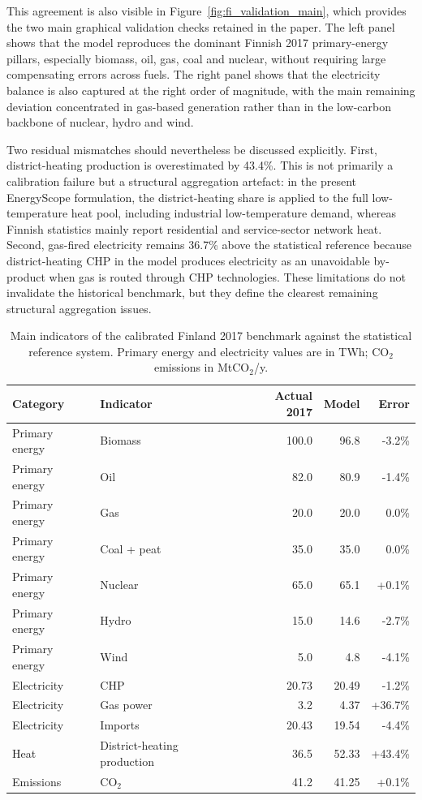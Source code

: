 \documentclass{article}
\begin{document}
This agreement is also visible in Figure~\ref{fig:fi_validation_main}, which provides the two main graphical validation checks retained in the paper. The left panel shows that the model reproduces the dominant Finnish 2017 primary-energy pillars, especially biomass, oil, gas, coal and nuclear, without requiring large compensating errors across fuels. The right panel shows that the electricity balance is also captured at the right order of magnitude, with the main remaining deviation concentrated in gas-based generation rather than in the low-carbon backbone of nuclear, hydro and wind.

Two residual mismatches should nevertheless be discussed explicitly. First, district-heating production is overestimated by 43.4\%. This is not primarily a calibration failure but a structural aggregation artefact: in the present EnergyScope formulation, the district-heating share is applied to the full low-temperature heat pool, including industrial low-temperature demand, whereas Finnish statistics mainly report residential and service-sector network heat. Second, gas-fired electricity remains 36.7\% above the statistical reference because district-heating CHP in the model produces electricity as an unavoidable by-product when gas is routed through CHP technologies. These limitations do not invalidate the historical benchmark, but they define the clearest remaining structural aggregation issues.

\begin{table}[H]
  \centering
  \small
  \renewcommand{\arraystretch}{1.08}
  \begin{tabularx}{\linewidth}{llrrr}
    \toprule
    \textbf{Category} & \textbf{Indicator} & \textbf{Actual 2017} & \textbf{Model} & \textbf{Error} \\
    \midrule
    Primary energy & Biomass & 100.0 & 96.8 & -3.2\% \\
    Primary energy & Oil & 82.0 & 80.9 & -1.4\% \\
    Primary energy & Gas & 20.0 & 20.0 & 0.0\% \\
    Primary energy & Coal + peat & 35.0 & 35.0 & 0.0\% \\
    Primary energy & Nuclear & 65.0 & 65.1 & +0.1\% \\
    Primary energy & Hydro & 15.0 & 14.6 & -2.7\% \\
    Primary energy & Wind & 5.0 & 4.8 & -4.1\% \\
    Electricity & CHP & 20.73 & 20.49 & -1.2\% \\
    Electricity & Gas power & 3.2 & 4.37 & +36.7\% \\
    Electricity & Imports & 20.43 & 19.54 & -4.4\% \\
    Heat & District-heating production & 36.5 & 52.33 & +43.4\% \\
    Emissions & CO$_2$ & 41.2 & 41.25 & +0.1\% \\
    \bottomrule
  \end{tabularx}
  \caption{Main indicators of the calibrated Finland 2017 benchmark against the statistical reference system. Primary energy and electricity values are in TWh; CO$_2$ emissions in MtCO$_2$/y.}
  \label{tab:fi_validation_2017}
\end{table}
\end{document}
